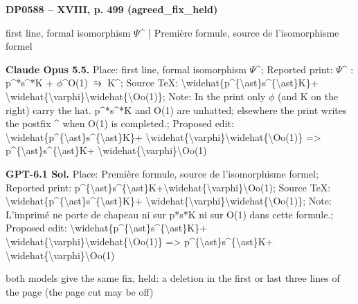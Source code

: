 \par\noindent\hypertarget{DP0588}{}\textbf{DP0588 -- XVIII, p. 499 (agreed\_fix\_held)}\par
first line, formal isomorphism \ensuremath{\Psi}\textasciicircum{} | Première formule, source de l'isomorphisme formel\par
\textbf{Claude Opus 5.5.} Place: first line, formal isomorphism \ensuremath{\Psi}\textasciicircum{}; Reported print: \ensuremath{\Psi}\textasciicircum{} : p\textasciicircum{}*s\textasciicircum{}*K + \ensuremath{\phi}\textasciicircum{}O(1) \ensuremath{⥲} K\textasciicircum{}; Source TeX: \textbackslash{}widehat\{p\textasciicircum{}\{\textbackslash{}ast\}s\textasciicircum{}\{\textbackslash{}ast\}K\}+ \textbackslash{}widehat\{\textbackslash{}varphi\}\textbackslash{}widehat\{\textbackslash{}Oo(1)\}; Note: In the print only \ensuremath{\phi} (and K on the right) carry the hat. p\textasciicircum{}*s\textasciicircum{}*K and O(1) are unhatted; elsewhere the print writes the postfix \textasciicircum{} when O(1) is completed.; Proposed edit: \textbackslash{}widehat\{p\textasciicircum{}\{\textbackslash{}ast\}s\textasciicircum{}\{\textbackslash{}ast\}K\}+ \textbackslash{}widehat\{\textbackslash{}varphi\}\textbackslash{}widehat\{\textbackslash{}Oo(1)\} =\allowbreak > p\textasciicircum{}\{\textbackslash{}ast\}s\textasciicircum{}\{\textbackslash{}ast\}K+ \textbackslash{}widehat\{\textbackslash{}varphi\}\textbackslash{}Oo(1)\par
\textbf{GPT-6.1 Sol.} Place: Première formule, source de l'isomorphisme formel; Reported print: p\textasciicircum{}\{\textbackslash{}ast\}s\textasciicircum{}\{\textbackslash{}ast\}K+\textbackslash{}widehat\{\textbackslash{}varphi\}\textbackslash{}Oo(1); Source TeX: \textbackslash{}widehat\{p\textasciicircum{}\{\textbackslash{}ast\}s\textasciicircum{}\{\textbackslash{}ast\}K\}+ \textbackslash{}widehat\{\textbackslash{}varphi\}\textbackslash{}widehat\{\textbackslash{}Oo(1)\}; Note: L'imprimé ne porte de chapeau ni sur p*s*K ni sur O(1) dans cette formule.; Proposed edit: \textbackslash{}widehat\{p\textasciicircum{}\{\textbackslash{}ast\}s\textasciicircum{}\{\textbackslash{}ast\}K\}+ \textbackslash{}widehat\{\textbackslash{}varphi\}\textbackslash{}widehat\{\textbackslash{}Oo(1)\} =\allowbreak > p\textasciicircum{}\{\textbackslash{}ast\}s\textasciicircum{}\{\textbackslash{}ast\}K+ \textbackslash{}widehat\{\textbackslash{}varphi\}\textbackslash{}Oo(1)\par
both models give the same fix, held: a deletion in the first or last three lines of the page (the page cut may be off)\par
